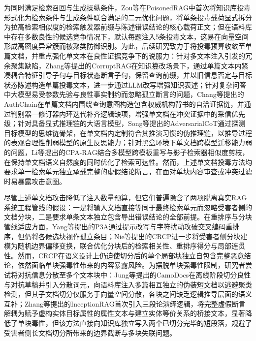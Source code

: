 为同时满足检索召回与生成操纵条件，Zou等\cite{zou2025poisonedrag}在PoisonedRAG中首次将知识库投毒形式化为检索条件与生成条件联合满足的二元优化问题，将单条投毒载荷显式拆分为拉高检索相似度的检索触发器前缀与陈述错误结论的核心载荷正文；但在语料库中存在多数良性的候选竞争情况下，默认每题注入5条投毒文本，这易在向量空间形成高密度异常簇而被聚类防御识别。为此，后续研究致力于将投毒预算收敛至单篇文档，并重点强化单文本在良性证据竞争下的说服力：针对多文本注入引发的冗余聚集缺陷，Zhang等\cite{zhang2026corruptrag}提出的CorruptRAG在知识篡改场景下，通过单篇文本内紧凑耦合特征引导子句与目标状态断言子句，保留查询前缀，并以旧信息否定与目标状态陈述构造单篇投毒文本，进一步通过LLM改写增强知识表述；针对复杂问答中大模型易受参数先验与良性事实制约而忽略孤立断言的问题，Chang等\cite{chang2025oneshot}提出的AuthChain在单篇文档内围绕查询意图构造包含权威机构背书的自洽证据链，并通过判别器—修订器内环迭代补齐逻辑缺项，增强单文档在冲突证据中的采信优先级；针对具备显式推理链的大语言模型，Song等\cite{song2026adversarialcot}提出的AdversarialCoT通过探测目标模型的思维链骨架，在单文档内定制符合其推演习惯的伪推理链，以推导过程的表观合理性削弱模型的原生反思能力；针对黑盒环境下单文档跨模型迁移能力弱的问题，Li等\cite{li2026cparag}提出的CPA-RAG结合多模型跨模板重写与影子检索器相似度剪枝，在保持单文档语义自然度的同时优化了检索可达性。然而，上述单文档投毒方法均要求单一检索单元独立承载完整的虚假结论断言，在面对单块内容审查或冲突过滤时易暴露攻击意图。

尽管上述单文档攻击降低了注入数量预算，但它们普遍隐含了两项脱离真实RAG系统工程管线的假设：一是将输入文档直接等同于最终检索单元而忽略受害者侧的文档分块，二是要求单条文本独立包含导出错误结论的全部前提。在重排序与分块管线适应方面，Yang等\cite{yang2026p3a}提出的P3A通过提示改写与字符扰动攻破交叉编码重排序，但仍将各候选块视作孤立条目；Nie等\cite{nie2026crcp}提出的CRCP进一步将受害者侧分块建模为随机边界偏移变换，联合优化分块后的检索相关性、重排序得分与局部连贯性。然而，CRCP在语义设计上仍迫使切分后的单个局部块独立自包含完整恶意结论，依然面临单块强毒性带来的内容暴露风险。为摆脱单块强毒性限制，研究者尝试将对抗信息分散至多个文本块中：Jung等\cite{jung2026camodocs}提出的CamoDocs在离线阶段切分良性与对抗草稿并引入分散词元，向语料库注入多篇相互独立的伪装短文档以逃避聚类检测，但其子文档切分仅服务于向量空间分散，各块之间缺乏逻辑推导层面的语义互补；Zhang等\cite{zhang2026inceptionrag}提出的InceptionRAG首次引入三段论演绎逻辑，将完整虚假断言解耦为赋予虚构实体目标属性的属性文本与建立实体等价关系的桥接文本，显著降低了单块毒性，但该方法直接向知识库独立写入两个已切分完毕的短段落，规避了受害者侧长文档切分所带来的边界截断与多块失联问题。

